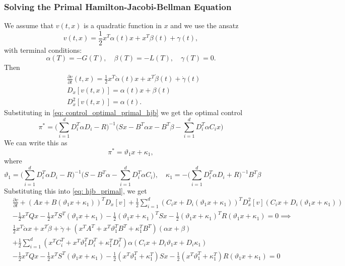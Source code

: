 \subsubsection{Solving the Primal Hamilton-Jacobi-Bellman Equation}
We assume that $v(t,x)$ is a quadratic function in $x$ and we use the ansatz
\begin{equation}
    v(t,x) = \frac12 x^T \alpha(t) x + x^T \beta(t) + \gamma(t), 
    \label{eq: ansatz_primal_hjb}
\end{equation}
with terminal conditions:
\begin{equation}
    \alpha(T) = -G(T), \quad \beta(T) = - L(T), \quad \gamma(T) = 0. \label{eq: terminal_conditions_pirmal_hjb}
\end{equation}
Then 
\begin{align*}
    &\frac{\partial v}{\partial t}(t,x) = \frac12 x^T \dot{\alpha}(t) x + x^T \dot{\beta}(t) + \dot{\gamma}(t)\\
    &D_x[v(t,x)] = \alpha(t) x + \beta(t)\\
    &D^2_x[v(t,x)] = \alpha(t).
\end{align*}
Substituting in \eqref{eq: control_optimal_primal_hjb} we get the optimal control
\begin{equation*}
    \pi^\ast = \bigg(\sum_{i=1}^d D_i^T \alpha D_i - R\bigg)^{-1} \bigg(S x - B^T \alpha x - B^T \beta - \sum_{i=1}^d D_i^T \alpha C_i x\bigg)
\end{equation*}
We can write this as 
\begin{equation*}
    \pi^\ast = \vartheta_1 x + \kappa_1,
\end{equation*}
where
\begin{equation}
    \vartheta_1 = \bigg(\sum_{i=1}^d D_i^T \alpha D_i - R\bigg)^{-1} \bigg(S - B^T \alpha - \sum_{i=1}^d D_i^T \alpha C_i \bigg), \quad \kappa_1 = -\bigg(\sum_{i=1}^d D_i^T \alpha D_i + R\bigg)^{-1} B^T \beta \label{eq: theta_kappa_primal_hjb}
\end{equation}
Substituting this into \eqref{eq: hjb_primal}, we get 
\begin{align*}
    &\frac{\partial v}{\partial t} + (A x + B (\vartheta_1 x + \kappa_1))^T D_x[v] + \frac12 \sum_{i=1}^d (C_i x + D_i (\vartheta_1 x + \kappa_1))^T D_x^2[v](C_i x + D_i (\vartheta_1 x + \kappa_1))\\
    &- \frac12 x^T Q x - \frac12 x^T S^T (\vartheta_1 x + \kappa_1) - \frac12 {(\vartheta_1 x + \kappa_1)}^T S x - \frac12 {(\vartheta_1 x + \kappa_1)}^T R (\vartheta_1 x + \kappa_1) = 0 \implies \\
    &\frac12 x^T \dot{\alpha} x + x^T \dot{\beta} + \dot{\gamma} + (x^T A^T + x^T \vartheta_1^T B^T + \kappa_1^T B^T)(\alpha x + \beta)\\
    &+ \frac12 \sum_{i=1}^d (x^T C_i^T + x^T \vartheta_1^T D_i^T + \kappa_1^T D_i^T)\alpha ( C_i x + D_i \vartheta_1 x + D_i \kappa_1)\\
    &- \frac12 x^T Q x - \frac12 x^T S^T (\vartheta_1 x + \kappa_1) - \frac12 {(x^T \vartheta_1^T  + \kappa_1^T)} S x - \frac12 {(x^T \vartheta_1^T + \kappa_1^T)} R (\vartheta_1 x + \kappa_1) = 0
\end{align*}

